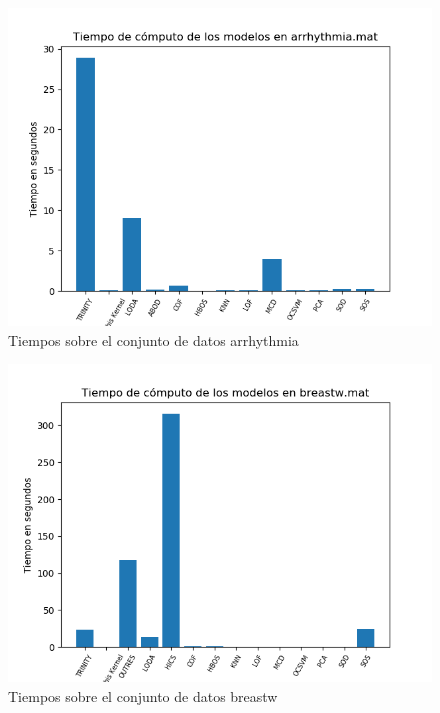\begin{figure}[H]
	\centering
	\includegraphics[scale=0.7]{imagenes/imgs-exp1/times/arrhythmia}
	\caption{Tiempos sobre el conjunto de datos arrhythmia}
	\label{arrhythmia_times}
\end{figure}

\begin{figure}[H]
	\centering
	\includegraphics[scale=0.7]{imagenes/imgs-exp1/times/breastw}
	\caption{Tiempos sobre el conjunto de datos breastw}
	\label{breastw_times}
\end{figure}

